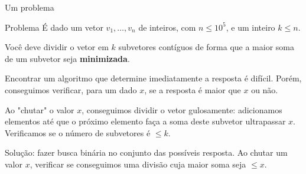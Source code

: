 \begin{frame}{Um problema}

    \begin{block}{Problema}
        É dado um vetor $v_1, \dots, v_n$ de inteiros, com $n \leq 10^5$, e um inteiro $k \leq n$.  \pause

        Você deve dividir o vetor em $k$ subvetores contíguos de forma que a maior soma de um subvetor seja {\bf minimizada}.
    \end{block} \pause

    Encontrar um algoritmo que determine imediatamente a resposta é difícil. Porém, conseguimos verificar, para um dado $x$, se a resposta é maior que $x$ ou não. \pause

    Ao "chutar" o valor $x$, conseguimos dividir o vetor gulosamente: adicionamos elementos até que o próximo elemento faça a soma deste subvetor ultrapassar $x$. Verificamos se o número de subvetores é $\leq k$. \pause

    Solução: fazer busca binária no conjunto das possíveis resposta. Ao chutar um valor $x$, verificar se conseguimos uma divisão cuja maior soma seja $\leq x$.

\end{frame}

